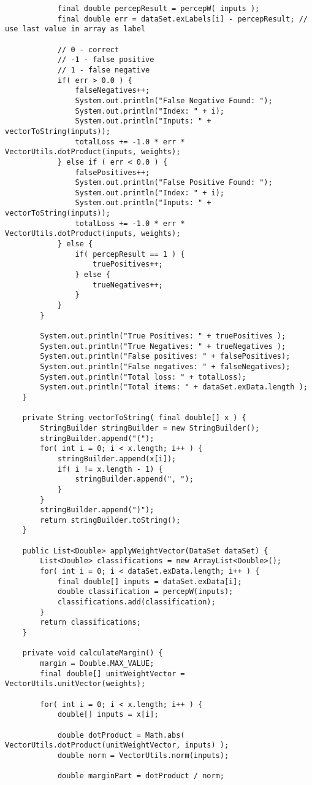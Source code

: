 \begin{lstlisting}
			final double percepResult = percepW( inputs );
			final double err = dataSet.exLabels[i] - percepResult; // use last value in array as label
			
			// 0 - correct
			// -1 - false positive
			// 1 - false negative
			if( err > 0.0 ) {
				falseNegatives++;
				System.out.println("False Negative Found: ");
				System.out.println("Index: " + i);
				System.out.println("Inputs: " + vectorToString(inputs));
				totalLoss += -1.0 * err * VectorUtils.dotProduct(inputs, weights);
			} else if ( err < 0.0 ) {
				falsePositives++;
				System.out.println("False Positive Found: ");
				System.out.println("Index: " + i);
				System.out.println("Inputs: " + vectorToString(inputs));
				totalLoss += -1.0 * err * VectorUtils.dotProduct(inputs, weights);
			} else {
				if( percepResult == 1 ) {
					truePositives++;
				} else {
					trueNegatives++;
				}
			}
		}
		
		System.out.println("True Positives: " + truePositives );
		System.out.println("True Negatives: " + trueNegatives );
		System.out.println("False positives: " + falsePositives);
		System.out.println("False negatives: " + falseNegatives);
		System.out.println("Total loss: " + totalLoss);
		System.out.println("Total items: " + dataSet.exData.length );
	}
	
	private String vectorToString( final double[] x ) {
		StringBuilder stringBuilder = new StringBuilder();
		stringBuilder.append("(");
		for( int i = 0; i < x.length; i++ ) {
			stringBuilder.append(x[i]);
			if( i != x.length - 1) {
				stringBuilder.append(", ");
			}
		}
		stringBuilder.append(")");
		return stringBuilder.toString();
	}
	
	public List<Double> applyWeightVector(DataSet dataSet) {
		List<Double> classifications = new ArrayList<Double>();
		for( int i = 0; i < dataSet.exData.length; i++ ) {
			final double[] inputs = dataSet.exData[i];
			double classification = percepW(inputs);
			classifications.add(classification);
		}
		return classifications;
	}
	
	private void calculateMargin() {
		margin = Double.MAX_VALUE;
		final double[] unitWeightVector = VectorUtils.unitVector(weights);
		
		for( int i = 0; i < x.length; i++ ) {
			double[] inputs = x[i];
			
			double dotProduct = Math.abs( VectorUtils.dotProduct(unitWeightVector, inputs) );
			double norm = VectorUtils.norm(inputs);
			
			double marginPart = dotProduct / norm;
			

\end{lstlisting}
